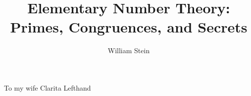 \documentclass{report}
\author{William Stein}
\title{Elementary Number Theory:\\Primes, Congruences, and Secrets}
\numberwithin{section}{chapter}
\numberwithin{equation}{section}
\theoremstyle{plain}
\theoremstyle{definition}
\theoremstyle{remark}
\begin{document}
\maketitle
{}
\setcounter{page}{5}
\newpage
\mbox{}
\vspace{2in}
\begin{center}
To my wife Clarita Lefthand
\end{center}

\newpage

\tableofcontents
\cleardoublepage




\printindex
\end{document}
